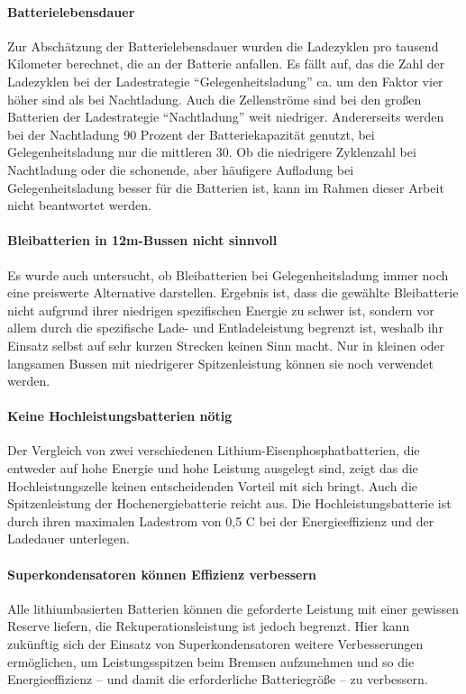 \paragraph{Batterielebensdauer} Zur Abschätzung der Batterielebensdauer wurden die Ladezyklen pro tausend Kilometer berechnet, die an der Batterie anfallen. Es fällt auf, das die Zahl der Ladezyklen bei der Ladestrategie "`Gelegenheitsladung"' ca. um den Faktor vier höher sind als bei Nachtladung. Auch die Zellenströme sind bei den großen Batterien der Ladestrategie "`Nachtladung"' weit niedriger. Andererseits werden bei der Nachtladung 90 Prozent der Batteriekapazität genutzt, bei Gelegenheitsladung nur die mittleren 30. Ob die niedrigere Zyklenzahl bei Nachtladung oder die schonende, aber häufigere Aufladung bei Gelegenheitsladung besser für die Batterien ist, kann im Rahmen dieser Arbeit nicht beantwortet werden.

\paragraph{Bleibatterien in 12m-Bussen nicht sinnvoll} Es wurde auch untersucht, ob Bleibatterien bei Gelegenheitsladung immer noch eine preiswerte Alternative darstellen. Ergebnis ist, dass die gewählte Bleibatterie nicht aufgrund ihrer niedrigen spezifischen Energie zu schwer ist, sondern vor allem durch die spezifische Lade- und Entladeleistung begrenzt ist, weshalb ihr Einsatz selbst auf sehr kurzen Strecken keinen Sinn macht. Nur in kleinen oder langsamen Bussen mit niedrigerer Spitzenleistung können sie noch verwendet werden.

\paragraph{Keine Hochleistungsbatterien nötig} Der Vergleich von zwei verschiedenen Lithium-Eisenphosphatbatterien, die entweder auf hohe Energie und hohe Leistung ausgelegt sind, zeigt das die Hochleistungszelle keinen entscheidenden Vorteil mit sich bringt. Auch die Spitzenleistung der Hochenergiebatterie reicht aus. Die Hochleistungsbatterie ist durch ihren maximalen Ladestrom von 0,5 C bei  der Energieeffizienz und der Ladedauer unterlegen.

\paragraph{Superkondensatoren können Effizienz verbessern} Alle lithiumbasierten Batterien können die geforderte Leistung mit einer gewissen Reserve liefern, die Rekuperationsleistung ist jedoch begrenzt. Hier kann zukünftig sich der Einsatz von Superkondensatoren weitere Verbesserungen ermöglichen, um Leistungsspitzen beim Bremsen aufzunehmen und so die Energieeffizienz – und damit die erforderliche Batteriegröße – zu verbessern.

